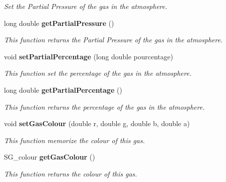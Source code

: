 \begin{CompactItemize}
\begin{CompactList}\small\item\em Set the Partial Pressure of the gas in the atmosphere. \item\end{CompactList}\item 
long double {\bf get\-Partial\-Pressure} ()\label{class_s_g___gas_a20}

\begin{CompactList}\small\item\em This function returns the Partial Pressure of the gas in the atmosphere. \item\end{CompactList}\item 
void {\bf set\-Partial\-Percentage} (long double pourcentage)
\begin{CompactList}\small\item\em This function set the percentage of the gas in the atmosphere. \item\end{CompactList}\item 
long double {\bf get\-Partial\-Percentage} ()
\begin{CompactList}\small\item\em This function returns the percentage of the gas in the atmosphere. \item\end{CompactList}\item 
void {\bf set\-Gas\-Colour} (double r, double g, double b, double a)
\begin{CompactList}\small\item\em This function memorize the colour of this gas. \item\end{CompactList}\item 
SG\_\-colour {\bf get\-Gas\-Colour} ()
\begin{CompactList}\small\item\em This function returns the colour of this gas. \item\end{CompactList}\end{CompactItemize}
